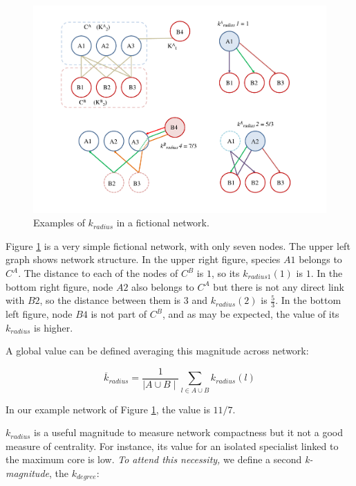 \documentclass[12pt]{article}
\begin{document}
\begin{figure}[h!]
\centering
\includegraphics[scale=0.4]{red_example.pdf}
\caption {Examples of \textit{$k_{radius}$} in a fictional network.}
\label{fig:KMAN_red_example}
\end{figure}

Figure \ref{fig:KMAN_red_example} is a very simple fictional network, with only seven nodes. The upper left graph shows network structure. In the upper right figure, species $A1$ belongs to $C^{A}$.  The distance to each of the nodes of $C^{B}$ is $1$, so its \textit{$k_{radius1}(1)$} is $1$. In the bottom right figure, node  $A2$ also belongs to $C^{A}$ but there is not any direct link with $B2$, so the distance between them is $3$ and \textit{$k_{radius}(2)$} is $\frac{5}{3}$. In the bottom left figure, node $B4$ is not part of $C^{B}$, and as may be expected, the value of its \textit{$k_{radius}$} is higher. 

A global value can be defined averaging this magnitude across network:

\begin{equation}
\displaystyle
\overline {k}_{radius} = \frac{1}{\mid A \cup B \mid}\sum\limits_{l \in A \cup B} k_{radius}(l)
\label{avgkradius}
\end{equation}

In our example network of Figure \ref{fig:KMAN_red_example}, the value is $11/7$. 

${k}_{radius}$ is a useful magnitude to measure network compactness but it not a good measure of centrality. For instance, its value for an isolated specialist linked to the maximum core is low. \emph{To attend this necessity,} we define a second \textit{k-magnitude}, the ${k}_{degree}$:
\end{document}
